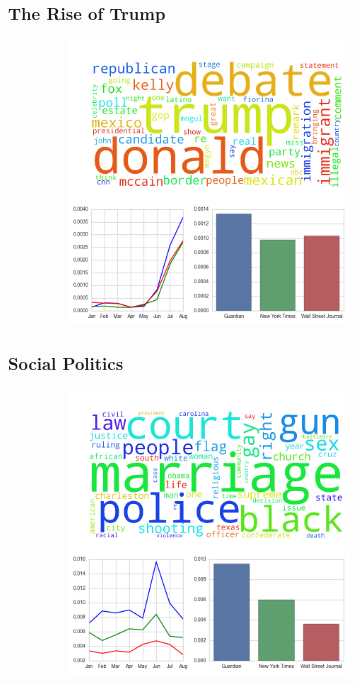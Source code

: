\documentclass[11pt]{beamer}
\begin{document}
\begin{frame}
\frametitle{The Rise of Trump}

\begin{figure}
\centering
\includegraphics[width=85mm,height=75mm]{figures/source_topic7.png}
\end{figure} 

\end{frame}


\begin{frame}
\frametitle{Social Politics}

\begin{figure}
\centering
\includegraphics[width=85mm,height=75mm]{figures/source_topic4.png}
\end{figure} 

\end{frame}

\end{document}
